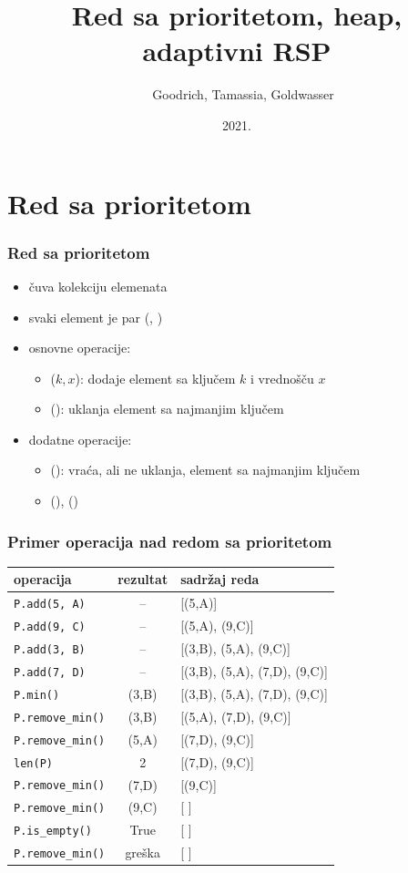 \documentclass[compress,aspectratio=169]{beamer}
\title{Red sa prioritetom, heap, adaptivni RSP}
\author{\textcopyright \ \ Goodrich, Tamassia, Goldwasser}
\institute{Katedra za informatiku, Fakultet tehničkih nauka, Univerzitet u
Novom Sadu}
\date{2021.}
\begin{document}
\frame{\titlepage}

\section[Red sa prioritetom]{Red sa prioritetom}
\begin{frame}[fragile]
  \frametitle{Red sa prioritetom}
  \begin{itemize}
    \item {} čuva kolekciju elemenata 
    \item svaki element je par (, )
    \item osnovne operacije:
    \begin{itemize}
      \item {}($k, x$): dodaje element sa ključem $k$ i vrednošču $x$
      \item {}(): uklanja element sa najmanjim ključem 
    \end{itemize}
    \item dodatne operacije:
    \begin{itemize}
      \item {}(): vraća, ali ne uklanja, element sa najmanjim ključem
      \item {}(), () 
    \end{itemize}
  \end{itemize}
\end{frame}

\begin{frame}[fragile,shrink=10]
  \frametitle{Primer operacija nad redom sa prioritetom}
\begin{center}
\begin{tabular}{lcl}
\textbf{operacija} & \textbf{rezultat} & \textbf{sadržaj reda} \\
\hline \hline
\texttt{P.add(5, A)} & -- & [(5,A)] \\ 
\texttt{P.add(9, C)} & -- & [(5,A), (9,C)] \\ 
\texttt{P.add(3, B)} & -- & [(3,B), (5,A), (9,C)] \\ 
\texttt{P.add(7, D)} & -- & [(3,B), (5,A), (7,D), (9,C)] \\ 
\texttt{P.min()} & (3,B) & [(3,B), (5,A), (7,D), (9,C)] \\ 
\texttt{P.remove\_min()} & (3,B) & [(5,A), (7,D), (9,C)] \\ 
\texttt{P.remove\_min()} & (5,A) & [(7,D), (9,C)] \\ 
\texttt{len(P)} & 2 & [(7,D), (9,C)] \\
\texttt{P.remove\_min()} & (7,D) & [(9,C)] \\ 
\texttt{P.remove\_min()} & (9,C) & [ ] \\ 
\texttt{P.is\_empty()} & True & [ ] \\ 
\texttt{P.remove\_min()} & greška & [ ]
\end{tabular}
\end{center}
\end{frame}
\end{document}
